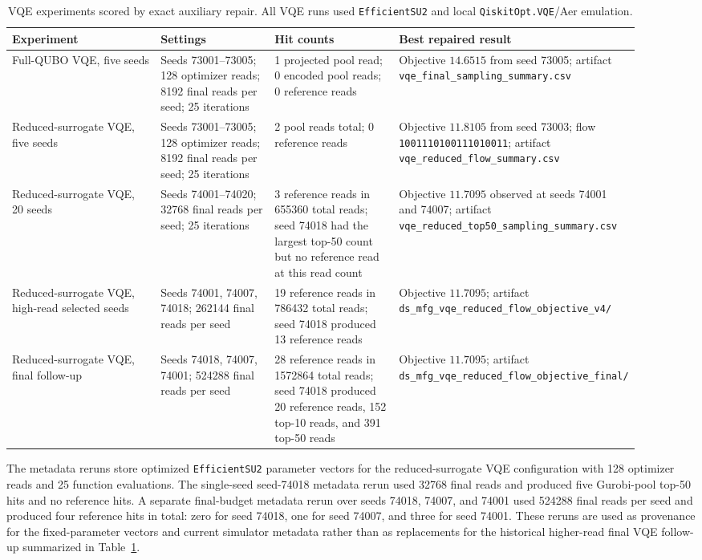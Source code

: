 \begin{table}[t]
\centering
\scriptsize
\caption{VQE experiments scored by exact auxiliary repair. All VQE runs used
\texttt{EfficientSU2} and local \texttt{QiskitOpt.VQE}/Aer emulation.}
\label{tab:ds-mfg-vqe-results}
\begin{tabular}{p{0.26\linewidth}p{0.20\linewidth}p{0.22\linewidth}p{0.23\linewidth}}
\hline
Experiment & Settings & Hit counts & Best repaired result \\
\hline
Full-QUBO VQE, five seeds & Seeds 73001--73005; 128 optimizer reads; 8192
final reads per seed; 25 iterations & 1 projected pool read; 0 encoded pool
reads; 0 reference reads & Objective $14.6515$ from seed 73005; artifact
\texttt{vqe\_final\_sampling\_summary.csv} \\
\hline
Reduced-surrogate VQE, five seeds & Seeds 73001--73005; 128 optimizer reads;
8192 final reads per seed; 25 iterations & 2 pool reads total; 0 reference reads &
Objective $11.8105$ from seed 73003; flow
\texttt{1001110100111010011}; artifact
\texttt{vqe\_reduced\_flow\_summary.csv} \\
\hline
Reduced-surrogate VQE, 20 seeds & Seeds 74001--74020; 32768 final reads per
seed; 25 iterations & 3 reference reads in 655360 total reads; seed 74018 had the
largest top-50 count but no reference read at this read count & Objective
$11.7095$ observed at seeds 74001 and 74007; artifact
\texttt{vqe\_reduced\_top50\_sampling\_summary.csv} \\
\hline
Reduced-surrogate VQE, high-read selected seeds & Seeds 74001, 74007, 74018;
262144 final reads per seed & 19 reference reads in 786432 total reads; seed
74018 produced 13 reference reads & Objective $11.7095$; artifact
\texttt{ds\_mfg\_vqe\_reduced\_flow\_objective\_v4/} \\
\hline
Reduced-surrogate VQE, final follow-up & Seeds 74018, 74007, 74001; 524288
final reads per seed & 28 reference reads in 1572864 total reads; seed 74018
produced 20 reference reads, 152 top-10 reads, and 391 top-50 reads & Objective
$11.7095$; artifact
\texttt{ds\_mfg\_vqe\_reduced\_flow\_objective\_final/} \\
\hline
\end{tabular}
\end{table}

The metadata reruns store optimized \texttt{EfficientSU2} parameter vectors for
the reduced-surrogate VQE configuration with 128 optimizer reads and 25 function
evaluations. The single-seed seed-74018 metadata rerun used 32768 final reads
and produced five Gurobi-pool top-50 hits and no reference hits. A separate
final-budget metadata rerun over seeds 74018, 74007, and 74001 used 524288 final
reads per seed and produced four reference hits in total: zero for seed 74018, one
for seed 74007, and three for seed 74001. These reruns are used as provenance
for the fixed-parameter vectors and current simulator metadata rather than as
replacements for the historical higher-read final VQE follow-up summarized in
Table~\ref{tab:ds-mfg-vqe-results}.

